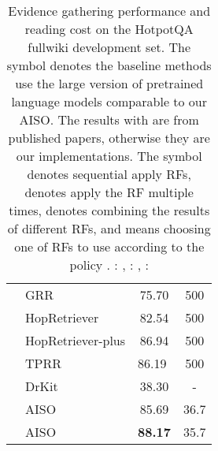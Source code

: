 \documentclass[11pt]{article}
\begin{document}
\begin{table}
{\begin{tabular}{llcc}
\hline
\multirow{4}{*}{}   & GRR \citep{Asai2020Learning}                       & 75.70                     & 500            \\
                                         & HopRetriever \citep{li2020hopretriever}              & 82.54                     & 500            \\
                                         & HopRetriever-plus   & 86.94                     & 500              \\
                                         & TPRR \citep{TPRR}                      & \multicolumn{1}{l}{86.19} & 500            \\ 
\hline
                  & DrKit \citep{Dhingra2020Differentiable}                             & 38.30                     & -                   \\ 
\hline
\multirow{2}{*}{} & AISO                        & 85.69                     & 36.7                \\
                                         & AISO                       & \textbf{88.17}            & 35.7                \\
\bottomrule
\end{tabular}}
\caption{Evidence gathering performance and reading cost on the HotpotQA fullwiki development set. 
The symbol  denotes the baseline methods use the large version of pretrained language models comparable to our AISO.
The results with  are from published papers, otherwise they are our implementations.
The symbol  denotes sequential apply RFs,  denotes apply the RF  multiple times,  denotes combining the results of different RFs, and  means choosing one of RFs to use according to the policy .
: \citep{nie-etal-2019-revealing},
: \citep{qi-etal-2019-answering},
: \citep{qi-etal-2019-answering}
}
\label{tab:hotpotqa_ret}
\end{table}
\end{document}
